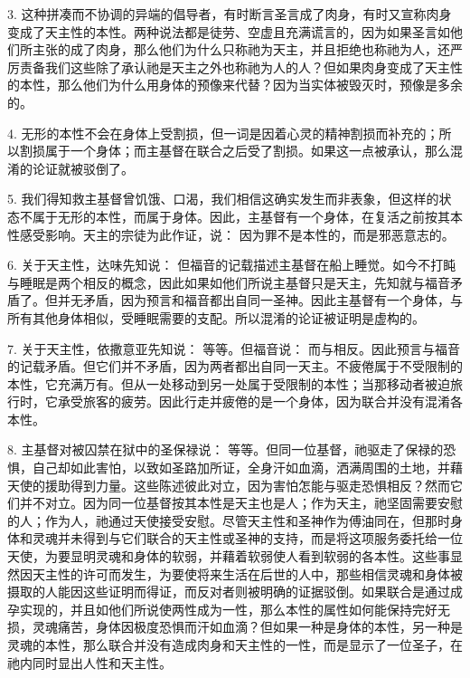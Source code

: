 3. 这种拼凑而不协调的异端的倡导者，有时断言圣言成了肉身，有时又宣称肉身变成了天主性的本性。两种说法都是徒劳、空虚且充满谎言的，因为如果圣言如他们所主张的成了肉身，那么他们为什么只称祂为天主，并且拒绝也称祂为人，还严厉责备我们这些除了承认祂是天主之外也称祂为人的人？但如果肉身变成了天主性的本性，那么他们为什么用身体的预像来代替？因为当实体被毁灭时，预像是多余的。\par

4. 无形的本性不会在身体上受割损，但一词是因着心灵的精神割损而补充的；所以割损属于一个身体；而主基督在联合之后受了割损。如果这一点被承认，那么混淆的论证就被驳倒了。\par

5. 我们得知救主基督曾饥饿、口渴，我们相信这确实发生而非表象，但这样的状态不属于无形的本性，而属于身体。因此，主基督有一个身体，在复活之前按其本性感受影响。天主的宗徒为此作证，说： 因为罪不是本性的，而是邪恶意志的。\par

6. 关于天主性，达味先知说： 但福音的记载描述主基督在船上睡觉。如今不打盹与睡眠是两个相反的概念，因此如果如他们所说主基督只是天主，先知就与福音矛盾了。但并无矛盾，因为预言和福音都出自同一圣神。因此主基督有一个身体，与所有其他身体相似，受睡眠需要的支配。所以混淆的论证被证明是虚构的。\par

7. 关于天主性，依撒意亚先知说： 等等。但福音说： 而与相反。因此预言与福音的记载矛盾。但它们并不矛盾，因为两者都出自同一天主。不疲倦属于不受限制的本性，它充满万有。但从一处移动到另一处属于受限制的本性；当那移动者被迫旅行时，它承受旅客的疲劳。因此行走并疲倦的是一个身体，因为联合并没有混淆各本性。\par

8. 主基督对被囚禁在狱中的圣保禄说： 等等。但同一位基督，祂驱走了保禄的恐惧，自己却如此害怕，以致如圣路加所证，全身汗如血滴，洒满周围的土地，并藉天使的援助得到力量。这些陈述彼此对立，因为害怕怎能与驱走恐惧相反？然而它们并不对立。因为同一位基督按其本性是天主也是人；作为天主，祂坚固需要安慰的人；作为人，祂通过天使接受安慰。尽管天主性和圣神作为傅油同在，但那时身体和灵魂并未得到与它们联合的天主性或圣神的支持，而是将这项服务委托给一位天使，为要显明灵魂和身体的软弱，并藉着软弱使人看到软弱的各本性。这些事显然因天主性的许可而发生，为要使将来生活在后世的人中，那些相信灵魂和身体被摄取的人能因这些证明而得证，而反对者则被明确的证据驳倒。如果联合是通过成孕实现的，并且如他们所说使两性成为一性，那么本性的属性如何能保持完好无损，灵魂痛苦，身体因极度恐惧而汗如血滴？但如果一种是身体的本性，另一种是灵魂的本性，那么联合并没有造成肉身和天主性的一性，而是显示了一位圣子，在祂内同时显出人性和天主性。\par

